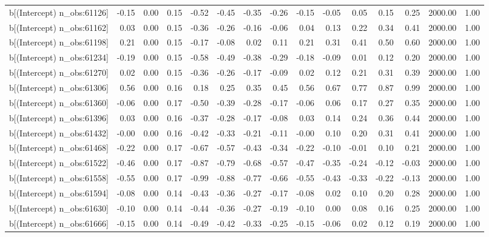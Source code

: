 \begin{table}[ht]
\begin{tabular}{rrrrrrrrrrrrrrr}
  b[(Intercept) n\_obs:61126] & -0.15 & 0.00 & 0.15 & -0.52 & -0.45 & -0.35 & -0.26 & -0.15 & -0.05 & 0.05 & 0.15 & 0.25 & 2000.00 & 1.00 \\ 
  b[(Intercept) n\_obs:61162] & 0.03 & 0.00 & 0.15 & -0.36 & -0.26 & -0.16 & -0.06 & 0.04 & 0.13 & 0.22 & 0.34 & 0.41 & 2000.00 & 1.00 \\ 
  b[(Intercept) n\_obs:61198] & 0.21 & 0.00 & 0.15 & -0.17 & -0.08 & 0.02 & 0.11 & 0.21 & 0.31 & 0.41 & 0.50 & 0.60 & 2000.00 & 1.00 \\ 
  b[(Intercept) n\_obs:61234] & -0.19 & 0.00 & 0.15 & -0.58 & -0.49 & -0.38 & -0.29 & -0.18 & -0.09 & 0.01 & 0.12 & 0.20 & 2000.00 & 1.00 \\ 
  b[(Intercept) n\_obs:61270] & 0.02 & 0.00 & 0.15 & -0.36 & -0.26 & -0.17 & -0.09 & 0.02 & 0.12 & 0.21 & 0.31 & 0.39 & 2000.00 & 1.00 \\ 
  b[(Intercept) n\_obs:61306] & 0.56 & 0.00 & 0.16 & 0.18 & 0.25 & 0.35 & 0.45 & 0.56 & 0.67 & 0.77 & 0.87 & 0.99 & 2000.00 & 1.00 \\ 
  b[(Intercept) n\_obs:61360] & -0.06 & 0.00 & 0.17 & -0.50 & -0.39 & -0.28 & -0.17 & -0.06 & 0.06 & 0.17 & 0.27 & 0.35 & 2000.00 & 1.00 \\ 
  b[(Intercept) n\_obs:61396] & 0.03 & 0.00 & 0.16 & -0.37 & -0.28 & -0.17 & -0.08 & 0.03 & 0.14 & 0.24 & 0.36 & 0.44 & 2000.00 & 1.00 \\ 
  b[(Intercept) n\_obs:61432] & -0.00 & 0.00 & 0.16 & -0.42 & -0.33 & -0.21 & -0.11 & -0.00 & 0.10 & 0.20 & 0.31 & 0.41 & 2000.00 & 1.00 \\ 
  b[(Intercept) n\_obs:61468] & -0.22 & 0.00 & 0.17 & -0.67 & -0.57 & -0.43 & -0.34 & -0.22 & -0.10 & -0.01 & 0.10 & 0.21 & 2000.00 & 1.00 \\ 
  b[(Intercept) n\_obs:61522] & -0.46 & 0.00 & 0.17 & -0.87 & -0.79 & -0.68 & -0.57 & -0.47 & -0.35 & -0.24 & -0.12 & -0.03 & 2000.00 & 1.00 \\ 
  b[(Intercept) n\_obs:61558] & -0.55 & 0.00 & 0.17 & -0.99 & -0.88 & -0.77 & -0.66 & -0.55 & -0.43 & -0.33 & -0.22 & -0.13 & 2000.00 & 1.00 \\ 
  b[(Intercept) n\_obs:61594] & -0.08 & 0.00 & 0.14 & -0.43 & -0.36 & -0.27 & -0.17 & -0.08 & 0.02 & 0.10 & 0.20 & 0.28 & 2000.00 & 1.00 \\ 
  b[(Intercept) n\_obs:61630] & -0.10 & 0.00 & 0.14 & -0.44 & -0.36 & -0.27 & -0.19 & -0.10 & 0.00 & 0.08 & 0.16 & 0.25 & 2000.00 & 1.00 \\ 
  b[(Intercept) n\_obs:61666] & -0.15 & 0.00 & 0.14 & -0.49 & -0.42 & -0.33 & -0.25 & -0.15 & -0.06 & 0.02 & 0.12 & 0.19 & 2000.00 & 1.00 \\ 

\end{tabular}
\end{table}
